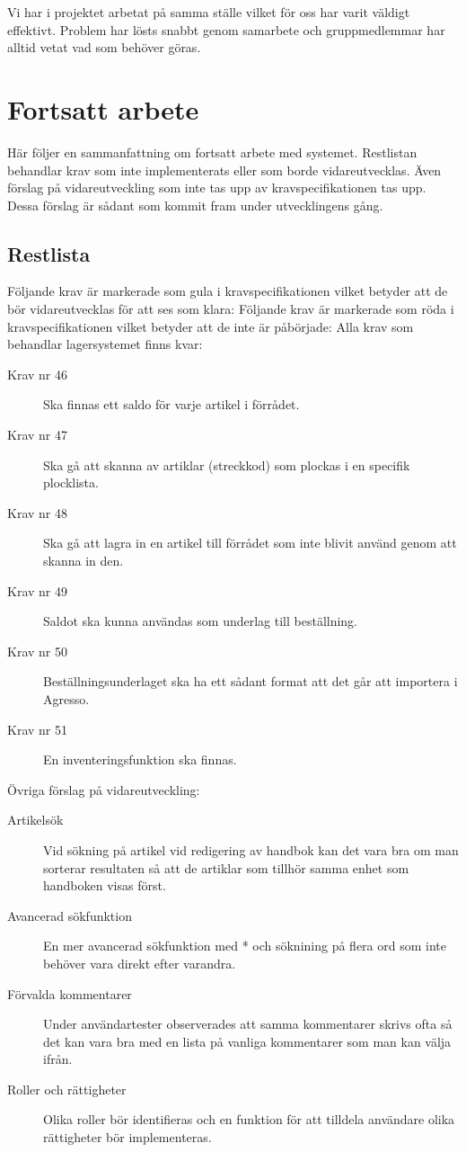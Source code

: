 \documentclass{article}
\begin{document}
Vi har i projektet arbetat på samma ställe vilket för oss har varit väldigt effektivt. Problem har lösts snabbt genom samarbete och gruppmedlemmar har alltid vetat vad som behöver göras.

\section{Fortsatt arbete}
Här följer en sammanfattning om fortsatt arbete med systemet. Restlistan behandlar krav som inte implementerats eller som borde vidareutvecklas. Även förslag på vidareutveckling som inte tas upp av kravspecifikationen tas upp. Dessa förslag är sådant som kommit fram under utvecklingens gång.

\subsection{Restlista}
Följande krav är markerade som gula i kravspecifikationen vilket betyder att de bör vidareutvecklas för att ses som klara:
Följande krav är markerade som röda i kravspecifikationen vilket betyder att de inte är påbörjade:
Alla krav som behandlar lagersystemet finns kvar:
\begin{description}
\item[Krav nr 46] Ska finnas ett saldo för varje artikel i förrådet.
\item[Krav nr 47] Ska gå att skanna av artiklar (streckkod) som plockas i en specifik plocklista.
\item[Krav nr 48] Ska gå att lagra in en artikel till förrådet som inte blivit använd genom att skanna in den.
\item[Krav nr 49] Saldot ska kunna användas som underlag till beställning.
\item[Krav nr 50] Beställningsunderlaget ska ha ett sådant format att det går att importera i Agresso.
\item[Krav nr 51] En inventeringsfunktion ska finnas.
\end{description}

Övriga förslag på vidareutveckling:


\begin{description}
\item[Artikelsök] Vid sökning på artikel vid redigering av handbok kan det vara bra om man sorterar resultaten så att de artiklar som tillhör samma enhet som handboken visas först.
\item[Avancerad sökfunktion] En mer avancerad sökfunktion med * och söknining på flera ord som inte behöver vara direkt efter varandra.
\item[Förvalda kommentarer] Under användartester observerades att samma kommentarer skrivs ofta så det kan vara bra med en lista på vanliga kommentarer som man kan välja ifrån.
\item[Roller och rättigheter] Olika roller bör identifieras och en funktion för att tilldela användare olika rättigheter bör implementeras.
\end{description}
\end{document}

